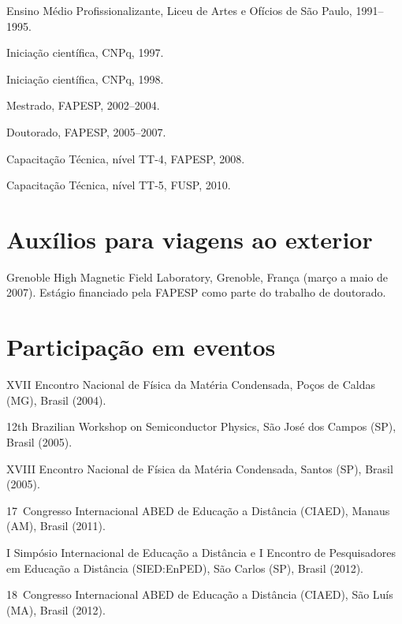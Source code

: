 \begin{compactitem}
	\item Ensino Médio Profissionalizante, Liceu de Artes e Ofícios de São Paulo, 1991--1995.
	\item Iniciação científica, CNPq, 1997.
	\item Iniciação científica, CNPq, 1998.
	\item Mestrado, FAPESP, 2002--2004.
	\item Doutorado, FAPESP, 2005--2007.
	\item Capacitação Técnica, nível TT-4, FAPESP, 2008.
	\item Capacitação Técnica, nível TT-5, FUSP, 2010.
\end{compactitem}

\section*{Auxílios para viagens ao exterior}

\begin{compactitem}
	\item Grenoble High Magnetic Field Laboratory, Grenoble, França (março a maio de 2007). Estágio financiado pela FAPESP como parte do trabalho de doutorado.
\end{compactitem}


\section*{Participação em eventos}

\begin{compactitem}
	\item XVII Encontro Nacional de Física da Matéria Condensada, Poços de Caldas (MG), Brasil (2004).
	\item 12th Brazilian Workshop on Semiconductor Physics, São José dos Campos (SP), Brasil (2005).
	\item XVIII Encontro Nacional de Física da Matéria Condensada, Santos (SP), Brasil (2005).
	\item 17\textordmasculine\ Congresso Internacional ABED de Educação a Distância (CIAED), Manaus (AM), Brasil (2011).
	\item I Simpósio Internacional de Educação a Distância e I Encontro de Pesquisadores em Educação a Distância (SIED:EnPED), São Carlos (SP), Brasil (2012).
	\item 18\textordmasculine\ Congresso Internacional ABED de Educação a Distância (CIAED), São Luís (MA), Brasil (2012).
\end{compactitem}

